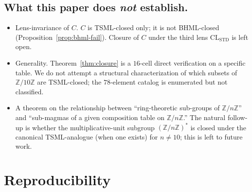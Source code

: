 \documentclass[11pt,reqno]{amsart}
\theoremstyle{plain}
\theoremstyle{definition}
\theoremstyle{remark}
\newcommand{\Z}{\mathbb{Z}}
\begin{document}
\subsection{What this paper does \emph{not} establish.}
\begin{itemize}
\item Lens-invariance of $C$.  $C$ is TSML-closed only; it is not
BHML-closed (Proposition~\ref{prop:bhml-fail}).  Closure of $C$ under
the third lens $\mathrm{CL}_\mathrm{STD}$ is left open.
\item Generality.  Theorem~\ref{thm:closure} is a $16$-cell direct
verification on a specific table.  We do not attempt a structural
characterization of which subsets of $\Z/10\Z$ are TSML-closed; the
$78$-element catalog is enumerated but not classified.
\item A theorem on the relationship between ``ring-theoretic
sub-groups of $\Z/n\Z$'' and ``sub-magmas of a given composition
table on $\Z/n\Z$.''  The natural follow-up is whether the
multiplicative-unit subgroup $(\Z/n\Z)^*$ is closed under the
canonical TSML-analogue (when one exists) for $n \neq 10$; this is
left to future work.
\end{itemize}

\section{Reproducibility}
\label{sec:repro}
\end{document}
